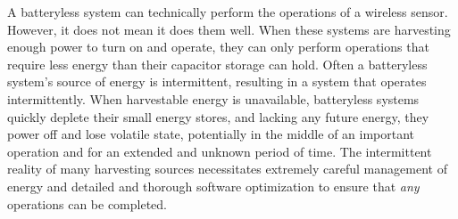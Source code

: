 A batteryless system can technically perform the operations of a wireless sensor. 
However, it does not mean it does them well.
When these systems are harvesting enough power to turn on and operate, they can only perform operations that require less energy than their capacitor storage can hold. 
Often a batteryless system's source of energy is intermittent, resulting in a system that operates intermittently.
When harvestable energy is unavailable, batteryless systems quickly deplete their
small energy stores, and lacking any future energy,
they power off and lose
volatile state, potentially in the middle of an important operation and for an extended and unknown period of time.
The intermittent reality of many harvesting sources necessitates extremely careful management of energy 
and detailed and thorough software optimization
to ensure that \textit{any} operations can be completed. 

